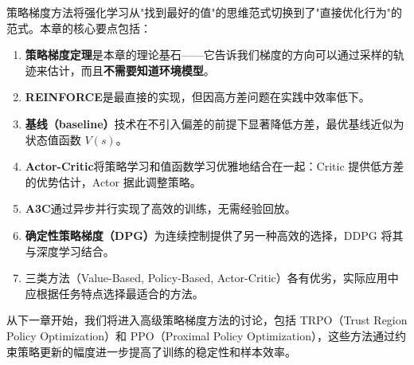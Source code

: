 策略梯度方法将强化学习从"找到最好的值"的思维范式切换到了"直接优化行为"的范式。本章的核心要点包括：

\begin{enumerate}
    \item \textbf{策略梯度定理}是本章的理论基石——它告诉我们梯度的方向可以通过采样的轨迹来估计，而且\textbf{不需要知道环境模型}。
    \item \textbf{REINFORCE}是最直接的实现，但因高方差问题在实践中效率低下。
    \item \textbf{基线（baseline）}技术在不引入偏差的前提下显著降低方差，最优基线近似为状态值函数 $V(s)$。
    \item \textbf{Actor-Critic}将策略学习和值函数学习优雅地结合在一起：Critic 提供低方差的优势估计，Actor 据此调整策略。
    \item \textbf{A3C}通过异步并行实现了高效的训练，无需经验回放。
    \item \textbf{确定性策略梯度（DPG）}为连续控制提供了另一种高效的选择，DDPG 将其与深度学习结合。
    \item 三类方法（Value-Based, Policy-Based, Actor-Critic）各有优劣，实际应用中应根据任务特点选择最适合的方法。
\end{enumerate}

\begin{remark}
从下一章开始，我们将进入高级策略梯度方法的讨论，包括 TRPO（Trust Region Policy Optimization）和 PPO（Proximal Policy Optimization），这些方法通过约束策略更新的幅度进一步提高了训练的稳定性和样本效率。
\end{remark}
